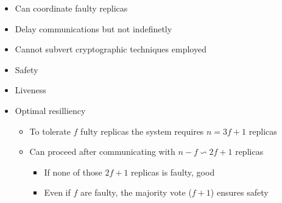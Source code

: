 \documentclass{easyclass}
\begin{document}
\begin{theo}{}
    \begin{itemize}
        \item Can coordinate faulty replicas
        \item Delay communications but not indefinetly
        \item Cannot subvert cryptographic techniques employed
    \end{itemize}
\end{theo}

\begin{theo}{}
    \begin{itemize}
        \item Safety
        \item Liveness
        \item Optimal resilliency 
        \begin{itemize}
            \item To tolerate $f$ fulty replicas the system requires $n = 3f + 1$ replicas
            \item Can proceed after communicating with $n-f \backsim 2f+1$ replicas
            \begin{itemize}
                \item If none of those $2f+1$ replicas is faulty, good
                \item Even if $f$ are faulty, the majority vote ($f+1$) ensures safety
            \end{itemize}
        \end{itemize}
    \end{itemize}
\end{theo}
\newpage
\end{document}
